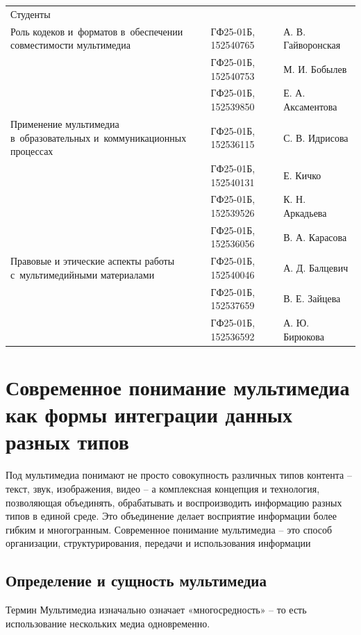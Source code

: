 \documentclass{ou}
\begin{document}
\begin{flushleft}
\doublespacing
\begin{tabularx}{\textwidth}{@{} p{} l l @{}}
Студенты     &                     &         \\
\multirow{-2.27}{\hsize}{\singlespacing Роль кодеков и~форматов в~обеспечении совместимости мультимедиа}
             & ГФ25-01Б, 152540765 & А. В. Гайворонская\\
             & ГФ25-01Б, 152540753 & М. И. Бобылев\\
             & ГФ25-01Б, 152539850 & Е. А. Аксаментова\\
\multirow{-2.27}{\hsize}{\singlespacing Применение мультимедиа в~образовательных и~коммуникационных процессах}
             & ГФ25-01Б, 152536115 & С. В. Идрисова\\
             & ГФ25-01Б, 152540131 & Е. Кичко\\
             & ГФ25-01Б, 152539526 & К. Н. Аркадьева\\
             & ГФ25-01Б, 152536056 & В. А. Карасова\\
\multirow{-2.27}{\hsize}{\singlespacing Правовые и этические аспекты работы с~мультимедийными материалами}
             & ГФ25-01Б, 152540046 & А. Д. Балцевич\\
             & ГФ25-01Б, 152537659 & В. Е. Зайцева\\
             & ГФ25-01Б, 152536592 & А. Ю. Бирюкова\\
            
\end{tabularx}
\end{flushleft}
\newpage
{
\sloppy
\tableofcontents
}
\newpage
\onehalfspacing
\section{Современное понимание мультимедиа как формы интеграции данных разных типов}
Под мультимедиа понимают не просто совокупность различных типов контента -- текст, звук, изображения, видео -- а комплексная концепция и технология, позволяющая объединять, обрабатывать и воспроизводить информацию разных типов в единой среде. Это объединение делает восприятие информации более гибким и многогранным.
Современное понимание мультимедиа -- это способ организации, структурирования, передачи и использования информации
\subsection{Определение и сущность мультимедиа}
Термин Мультимедиа изначально означает «многосредность» -- то есть использование нескольких медиа одновременно.
\end{document}

